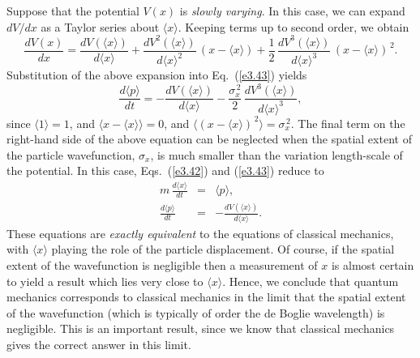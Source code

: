 Suppose that the potential $V(x)$ is {\em slowly varying}. In this case, we can
expand $dV/dx$ as a Taylor series about $\langle x\rangle$. Keeping
terms up to second order, we obtain
\begin{equation}
\frac{dV(x)}{dx} = \frac{dV(\langle x\rangle)}{d\langle x\rangle}
+ \frac{dV^2(\langle x\rangle)}{d\langle x\rangle^2}\,(x-\langle x\rangle)
+ \frac{1}{2}\,\frac{dV^3(\langle x\rangle)}{d\langle x\rangle^3}\,(x-\langle x\rangle)^{\,2}.
\end{equation}
Substitution of the above expansion into Eq.~(\ref{e3.43}) yields
\begin{equation}
\frac{d\langle p\rangle}{dt} = - \frac{dV(\langle x\rangle)}{d\langle x\rangle}
- \frac{\sigma_x^{\,2}}{2}\,\frac{dV^3(\langle x\rangle)}{d\langle x\rangle^3},
\end{equation}
since $\langle 1\rangle =1$, and $\langle x-\langle x\rangle\rangle = 0$,
and $\langle (x-\langle x\rangle)^{\,2}\rangle = \sigma_x^{\,2}$.
The final term on the right-hand side of the above equation can be neglected
when the spatial extent of the particle wavefunction, $\sigma_x$, is much
smaller than the variation length-scale of the potential. In this case,
Eqs.~(\ref{e3.42}) and (\ref{e3.43}) reduce to
\begin{eqnarray}
m\,\frac{d\langle x\rangle}{dt}&=& \langle p\rangle,\\[0.5ex]
\frac{d\langle p\rangle}{dt} &=& -\frac{dV(\langle x\rangle)}{d\langle x\rangle}.
\end{eqnarray}
These equations are {\em exactly equivalent}\/ to the equations of classical
mechanics, with $\langle x\rangle$ playing the role of the particle displacement. Of course, if the spatial extent of the wavefunction is negligible
then a measurement of $x$ is almost certain to yield a result which lies
very close to $\langle x\rangle$. Hence, we conclude that quantum mechanics
corresponds to classical mechanics in the limit that the spatial
extent of the wavefunction (which is typically of order the de Boglie wavelength) is negligible. This is an important result, since we know that
classical mechanics gives the correct answer in this limit.

